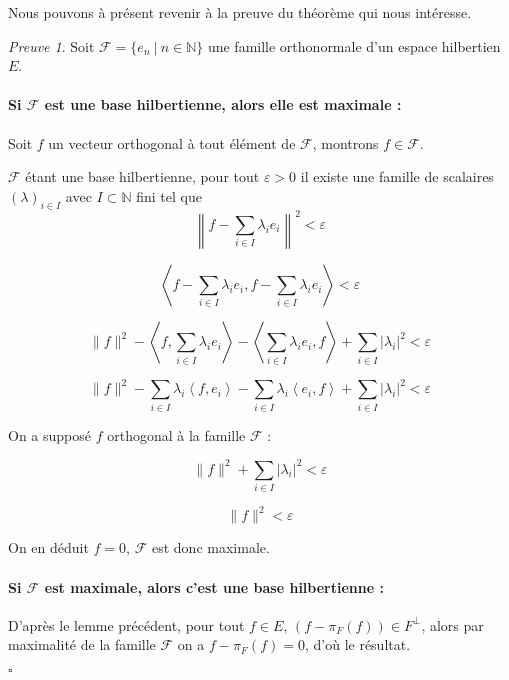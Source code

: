 \documentclass[]{article}
\theoremstyle{remark}
\newtheorem{myproof}{Preuve}
\theoremstyle{definition}
\newcommand{\cqfd}{
	\hfill$\square$
}
\begin{document}
	Nous pouvons à présent revenir à la preuve du théorème qui nous intéresse.
	
	\begin{myproof}
		Soit $\mathcal{F} = \{e_n ~ | ~ n \in \mathbb{N}\}$ une famille orthonormale d'un espace hilbertien $E$.
		
		\paragraph{Si $\mathcal{F}$ est une base hilbertienne, alors elle est maximale :}
		
		Soit $f$ un vecteur orthogonal à tout élément de $\mathcal{F}$, montrons $f \in \mathcal{F}$.
		
		$\mathcal{F}$ étant une base hilbertienne, pour tout $\varepsilon > 0$ il existe une famille de scalaires $(\lambda)_{i \in I}$ avec $I \subset \mathbb{N}$ fini tel que $$\left\|f - \sum_{i \in I} \lambda_i e_i\right\|^2 < \varepsilon$$
		
		$$\left\langle f - \sum_{i \in I} \lambda_i e_i, f - \sum_{i \in I} \lambda_i e_i \right\rangle < \varepsilon$$
		
		$$\|f\|^2 - \left\langle f, \sum_{i \in I} \lambda_i e_i \right\rangle - \left\langle \sum_{i \in I} \lambda_i e_i, f \right\rangle + \sum_{i \in I} |\lambda_i|^2 < \varepsilon$$
		
		$$\|f\|^2 - \sum_{i \in I} \lambda_i \left\langle f, e_i \right\rangle - \sum_{i \in I} \lambda_i \left\langle e_i, f \right\rangle + \sum_{i \in I} |\lambda_i|^2 < \varepsilon$$
		
		On a supposé $f$ orthogonal à la famille $\mathcal{F}$ :
		
		$$\|f\|^2 + \sum_{i \in I} |\lambda_i|^2 < \varepsilon$$
		
		$$\|f\|^2 < \varepsilon$$
		
		On en déduit $f = 0$, $\mathcal{F}$ est donc maximale.
		
		\paragraph{Si $\mathcal{F}$ est maximale, alors c'est une base hilbertienne :}
		
		D'après le lemme précédent, pour tout $f \in E$, $(f - \pi_F(f)) \in F^\bot$, alors par maximalité de la famille $\mathcal{F}$ on a $f - \pi_F(f) = 0$, d'où le résultat.
		
		\cqfd
	\end{myproof}
	
\end{document}
